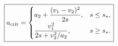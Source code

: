 \documentclass[border=2.5pt]{standalone}
\begin{document}
$\displaystyle \boxed{a_{\rm crit}=\begin{cases}a_2+\dfrac{(v_1-v_2)^2}{2s},&s\le s_*,\\[4pt]\dfrac{v_1^2}{2s+v_2^2/a_2},&s\ge s_*.\end{cases}}$
\end{document}
